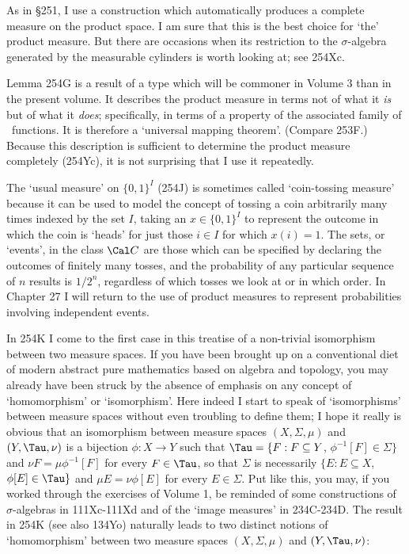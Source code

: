 {As in \S251, I use a construction which automatically produces a
complete measure on the product space.   I am sure that this is the best
choice for `the' product measure.   But there are occasions when its
restriction to the $\sigma$-algebra generated by the measurable
cylinders is worth looking at;  see 254Xc.

Lemma 254G is a result of a type which will be commoner in Volume 3
than in the present volume.   It describes the product measure in terms
not of what it {\it is} but of what it {\it does};
specifically, in terms of a property of the associated family of
\imp\ functions.  It
is therefore a `universal mapping theorem'.   (Compare 253F.)
Because this description is sufficient to determine the product measure
completely (254Yc), it is not surprising that I use it repeatedly.

The `usual measure' on $\{0,1\}^I$ (254J) is sometimes called
`coin-tossing measure' because it can be used to model the concept of
tossing a coin arbitrarily many times indexed by the set $I$, taking an
$x\in\{0,1\}^I$ to represent the outcome in which the coin is `heads'
for just those $i\in I$ for which $x(i)=1$.   The sets, or `events',
in the class $\Cal C$ are those which can be specified by declaring
the outcomes of
finitely many tosses, and the probability of any particular sequence of
$n$ results is $1/2^n$, regardless of which tosses we look at or in
which order.   In Chapter 27 I will return to the use of product
measures to represent probabilities involving independent events.

In 254K I come to the first case in this treatise of a non-trivial
isomorphism between two measure spaces.   If you have been brought up on
a conventional diet of modern abstract pure mathematics based on algebra
and topology, you may already have been struck by the absence of
emphasis on any concept of `homomorphism' or `isomorphism'.   Here
indeed I start to speak of `isomorphisms' between measure spaces
without even troubling to define them;  I hope it really is obvious that
an isomorphism between measure spaces $(X,\Sigma,\mu)$ and
$(Y,\Tau,\nu)$ is a bijection $\phi:X\to Y$ such that
$\Tau=\{F:F\subseteq Y$, $\phi^{-1}[F]\in\Sigma\}$ and
$\nu F=\mu\phi^{-1}[F]$ for every $F\in\Tau$, so that $\Sigma$ is
necessarily $\{E:E\subseteq X$, $\phi[E]\in\Tau\}$ and
$\mu E=\nu\phi[E]$
for every $E\in\Sigma$.   Put like this, you may, if you worked through
the exercises of Volume 1, be reminded of some constructions of
$\sigma$-algebras in 111Xc-111Xd and of the `image measures' in
234C-234D.   The result in 254K (see also 134Yo) naturally leads to two
distinct notions of
`homomorphism' between two measure spaces $(X,\Sigma,\mu)$ and
$(Y,\Tau,\nu)$:

}
